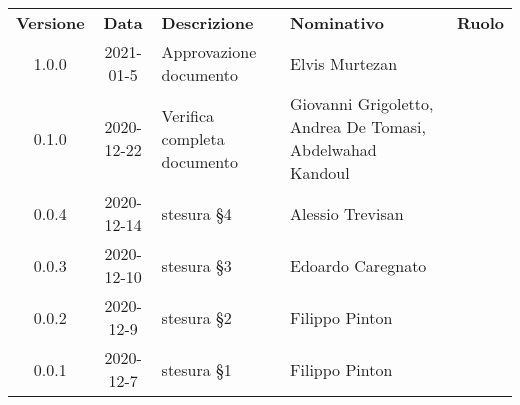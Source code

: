 {
\renewcommand{\arraystretch}{1.5}
\centering
\begin{longtable}{ c c  C{3.5cm}  C{4cm}  c }
    \rowcolor{\primaryColor}
    \textcolor{\secondaryColor}{
    \textbf{Versione}}     & \textcolor{\secondaryColor}{\textbf{Data}}       & \textcolor{\secondaryColor}
    {\textbf{Descrizione}} & \textcolor{\secondaryColor}{\textbf{Nominativo}} & \textcolor{\secondaryColor}{\textbf{Ruolo}}                                         \\


    1.0.0                  & 2021-01-5                                        & Approvazione documento                      & Elvis Murtezan      & \responsabile{} \\

    0.1.0                  & 2020-12-22                                       & Verifica completa documento                 & Giovanni Grigoletto, Andrea De Tomasi, Abdelwahad Kandoul  & \verificatore{} \\

    0.0.4               & 2020-12-14    & stesura §4 & Alessio Trevisan & \redattore{} \\

    0.0.3               & 2020-12-10    & stesura §3 & Edoardo Caregnato & \redattore{} \\

    0.0.2               & 2020-12-9    & stesura §2 & Filippo Pinton & \redattore{} \\

    0.0.1               & 2020-12-7    & stesura §1 & Filippo Pinton & \redattore{} \\



\end{longtable}
}